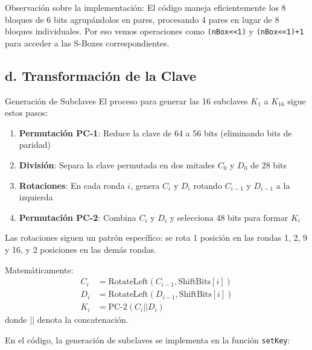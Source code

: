 \begin{securitygoodpractice}
Observación sobre la implementación: El código maneja eficientemente los 8 bloques de 6 bits agrupándolos en pares, procesando 4 pares en lugar de 8 bloques individuales. Por eso vemos operaciones como \texttt{(nBox<<1)} y \texttt{(nBox<<1)+1} para acceder a las S-Boxes correspondientes.
\end{securitygoodpractice}

\subsection{d. Transformación de la Clave}

\begin{cryptomethod}{Generación de Subclaves}
El proceso para generar las 16 subclaves $K_1$ a $K_{16}$ sigue estos pasos:

\begin{enumerate}
    \item \textbf{Permutación PC-1}: Reduce la clave de 64 a 56 bits (eliminando bits de paridad)
    \item \textbf{División}: Separa la clave permutada en dos mitades $C_0$ y $D_0$ de 28 bits
    \item \textbf{Rotaciones}: En cada ronda $i$, genera $C_i$ y $D_i$ rotando $C_{i-1}$ y $D_{i-1}$ a la izquierda
    \item \textbf{Permutación PC-2}: Combina $C_i$ y $D_i$ y selecciona 48 bits para formar $K_i$
\end{enumerate}

Las rotaciones siguen un patrón específico: se rota 1 posición en las rondas 1, 2, 9 y 16, y 2 posiciones en las demás rondas.

Matemáticamente:
\begin{align}
C_i &= \text{RotateLeft}(C_{i-1}, \text{ShiftBits}[i]) \\
D_i &= \text{RotateLeft}(D_{i-1}, \text{ShiftBits}[i]) \\
K_i &= \text{PC-2}(C_i || D_i)
\end{align}
donde $||$ denota la concatenación.
\end{cryptomethod}

En el código, la generación de subclaves se implementa en la función \texttt{setKey}:


